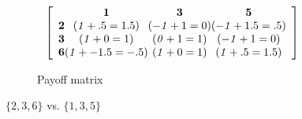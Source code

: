 \documentclass[11pt, oneside]{article} 	%
\begin{document}
\begin{figure}
\begin{subfigure}{.5\textwidth}
\[
\left[ 
\begin{array}{c@{}c@{}c@{}c}
& \mathbf{1} & \mathbf{3} & \mathbf{5} \\


\mathbf{2} &  (\mathit{1} + .5 = 1.5) & (\mathit{-1} + 1 = 0) & (\mathit{-1} + 1.5 = .5) \\
\mathbf{3} &  (\mathit{1} +0 =  1) & (\mathit{0} + 1 = 1) & (\mathit{-1} + 1 = 0) \\                         
 \mathbf{6} & (\mathit{1} + -1.5 = -.5) & (\mathit{1} + 0 = 1) & (\mathit{1} + .5 = 1.5) \\
\end{array}\right]
\]    
\caption{Payoff matrix}
\label{fig:236135_payoff}
\end{subfigure}

\caption{$\{2,3,6\}$ vs. $\{1,3,5\}$}
\label{fig:236135}
\end{figure}
\end{document}

